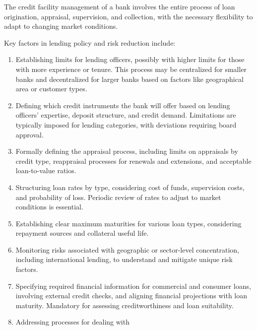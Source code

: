 
The credit facility management of a bank involves the entire process of loan
origination, appraisal, supervision, and collection, with the necessary
flexibility to adapt to changing market conditions.

Key factors in lending policy and risk reduction include:

\begin{enumerate}
\item {} Establishing limits for lending officers,
possibly with higher limits for those with more experience or tenure. This
process may be centralized for smaller banks and decentralized for larger banks
based on factors like geographical area or customer types.
\item {} Defining which credit instruments
the bank will offer based on lending officers' expertise, deposit structure, and
credit demand. Limitations are typically imposed for lending categories, with
deviations requiring board approval.
\item {} Formally defining the appraisal process,
including limits on appraisals by credit type, reappraisal processes for renewals
and extensions, and acceptable loan-to-value ratios.
\item {} Structuring loan rates by type, considering cost of
funds, supervision costs, and probability of loss. Periodic review of rates to
adjust to market conditions is essential.
\item {} Establishing clear maximum maturities for various loan
types, considering repayment sources and collateral useful life.
\item {} Monitoring risks associated with geographic
or sector-level concentration, including international lending, to understand and
mitigate unique risk factors.
\item {} Specifying required financial
information for commercial and consumer loans, involving external credit checks,
and aligning financial projections with loan maturity. Mandatory for assessing
creditworthiness and loan suitability.
\item {} Addressing processes for dealing with

\end{enumerate}
